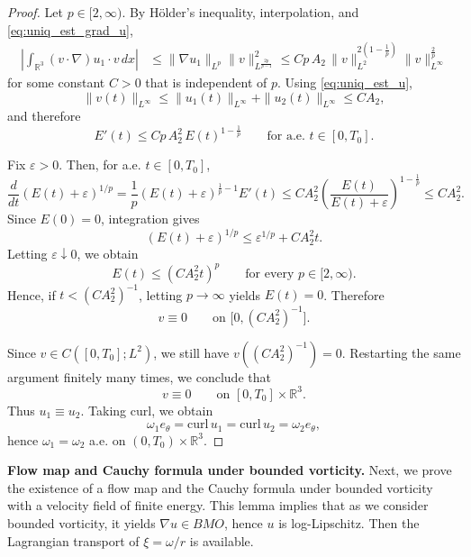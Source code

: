 \documentclass[reqno,11pt]{amsart}
\begin{document}
\begin{proof}
Let $p\in[2,\infty)$. By H\"older's inequality, interpolation, and
\eqref{eq:uniq_est_grad_u},
\begin{align*}
\left|
\int_{\mathbb R^3}(v\cdot\nabla)u_1\cdot v\,dx
\right|
&\le
\|\nabla u_1\|_{L^p}
\|v\|_{L^{\frac{2p}{p-1}}}^2
\le
C p\,A_2\,
\|v\|_{L^2}^{2(1-\frac1p)}
\|v\|_{L^\infty}^{\frac2p}
\end{align*}
for some constant $C>0$ that is independent of $p$.
Using \eqref{eq:uniq_est_u},
\[
\|v(t)\|_{L^\infty}
\le
\|u_1(t)\|_{L^\infty}+\|u_2(t)\|_{L^\infty}
\le CA_2,
\]
and therefore
\[
E'(t)\le C p\,A_2^2\,E(t)^{1-\frac1p}
\qquad\text{for a.e. }t\in[0,T_0].
\]

Fix $\varepsilon>0$. Then, for a.e. $t\in[0,T_0]$,
\[
\frac{d}{dt}(E(t)+\varepsilon)^{1/p}
=
\frac1p(E(t)+\varepsilon)^{\frac1p-1}E'(t)
\le
C A_2^2
\left(\frac{E(t)}{E(t)+\varepsilon}\right)^{1-\frac1p}
\le C A_2^2.
\]
Since $E(0)=0$, integration gives
\[
(E(t)+\varepsilon)^{1/p}\le \varepsilon^{1/p}+C A_2^2 t.
\]
Letting $\varepsilon\downarrow0$, we obtain
\[
E(t)\le (C A_2^2 t)^p
\qquad\text{for every }p\in[2,\infty).
\]
Hence, if $t<(CA_2^2)^{-1}$, letting $p\to\infty$ yields $E(t)=0$. Therefore
\[
v\equiv 0
\qquad\text{on }\bigl[0,(CA_2^2)^{-1}\bigr].
\]

Since $v\in C([0,T_0];L^2)$, we still have
$v((CA_2^2)^{-1})=0$. Restarting the same argument finitely many times, we conclude that
\[
v\equiv 0
\qquad\text{on }[0,T_0]\times\mathbb R^3.
\]
Thus $u_1\equiv u_2$. Taking curl, we obtain
\[
\omega_1 e_\theta=\mathrm{curl}\, u_1=\mathrm{curl}\, u_2=\omega_2 e_\theta,
\]
hence $\omega_1=\omega_2$ a.e. on $(0,T_0)\times \mathbb{R}^3$.
\end{proof}




\medskip
\noindent \textbf{Flow map and Cauchy formula under bounded vorticity.}
Next, we prove the existence of a flow map and the Cauchy formula under bounded vorticity with a velocity field of finite energy. 
This lemma implies that as we consider bounded vorticity, it yields $\nabla u \in BMO$, hence $u$ is log-Lipschitz. Then the Lagrangian transport of $\xi=\omega/r$ is available.
\end{document}
